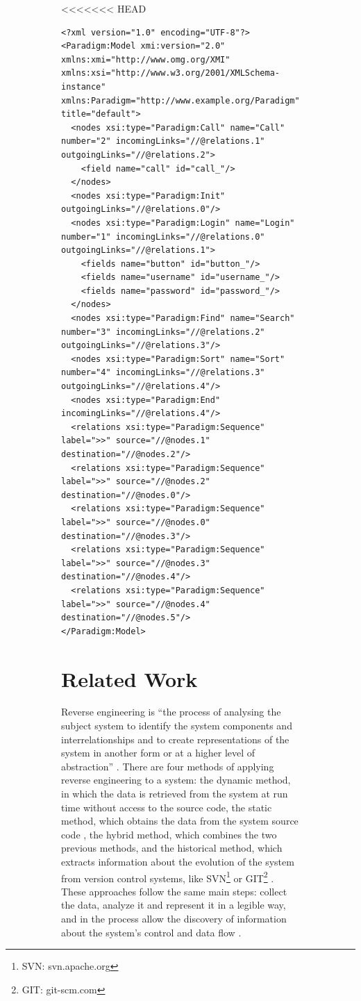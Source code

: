 \documentclass[conference]{IEEEtran}
\begin{document}
\begin{enumerate}
\begin{figure}[!htb]
\begin{itemize}
\begin{figure}[!htb]
\begin{itemize}
<<<<<<< HEAD
\begin{lstlisting}[frame=single,label=lst:paradigm_model,caption={An example of a generated model with identified patterns}]
<?xml version="1.0" encoding="UTF-8"?>
<Paradigm:Model xmi:version="2.0" xmlns:xmi="http://www.omg.org/XMI" xmlns:xsi="http://www.w3.org/2001/XMLSchema-instance" xmlns:Paradigm="http://www.example.org/Paradigm" title="default">
  <nodes xsi:type="Paradigm:Call" name="Call" number="2" incomingLinks="//@relations.1" outgoingLinks="//@relations.2">
    <field name="call" id="call_"/>
  </nodes>
  <nodes xsi:type="Paradigm:Init" outgoingLinks="//@relations.0"/>
  <nodes xsi:type="Paradigm:Login" name="Login" number="1" incomingLinks="//@relations.0" outgoingLinks="//@relations.1">
    <fields name="button" id="button_"/>
    <fields name="username" id="username_"/>
    <fields name="password" id="password_"/>
  </nodes>
  <nodes xsi:type="Paradigm:Find" name="Search" number="3" incomingLinks="//@relations.2" outgoingLinks="//@relations.3"/>
  <nodes xsi:type="Paradigm:Sort" name="Sort" number="4" incomingLinks="//@relations.3" outgoingLinks="//@relations.4"/>
  <nodes xsi:type="Paradigm:End" incomingLinks="//@relations.4"/>
  <relations xsi:type="Paradigm:Sequence" label=">>" source="//@nodes.1" destination="//@nodes.2"/>
  <relations xsi:type="Paradigm:Sequence" label=">>" source="//@nodes.2" destination="//@nodes.0"/>
  <relations xsi:type="Paradigm:Sequence" label=">>" source="//@nodes.0" destination="//@nodes.3"/>
  <relations xsi:type="Paradigm:Sequence" label=">>" source="//@nodes.3" destination="//@nodes.4"/>
  <relations xsi:type="Paradigm:Sequence" label=">>" source="//@nodes.4" destination="//@nodes.5"/>
</Paradigm:Model>
\end{lstlisting}

\section{Related Work}\label{sec:sota}

Reverse engineering is ``the process of analysing the subject system to identify the system components and interrelationships and to create representations of the system in another form or at a higher level of abstraction'' \cite{chikofsky1990reverse}. There are four methods of applying reverse engineering to a system: the dynamic method, in which the data is retrieved from the system at run time without access to the source code, the static method, which obtains the data from the system source code \cite{systa1999dynamic}, the hybrid method, which combines the two previous methods, and the historical method, which extracts information about the evolution of the system
from version control systems, like SVN\footnote{SVN: svn.apache.org} or GIT\footnote{GIT: git-scm.com} \cite{canfora2011achievements}. These approaches follow the same main steps: collect the data, analyze it and represent it in a legible way, and in the process allow the discovery of information about the system's control and data flow \cite{pacione2003comparative}.


\end{itemize}
\end{figure}
\end{itemize}
\end{figure}
\end{enumerate}
\end{document}
